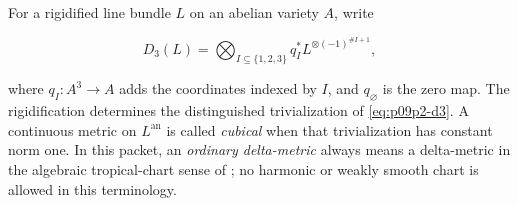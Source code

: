 
For a rigidified line bundle \(L\) on an abelian variety \(A\), write

\begin{equation}
\label{eq:p09p2-d3}
 D_3(L)=
 \bigotimes_{I\subseteq\{1,2,3\}}
 q_I^*L^{\otimes(-1)^{\# I+1}},
\end{equation}

where \(q_I:A^3\to A\) adds the coordinates indexed by \(I\), and \(q_\varnothing\)
is the zero map.  The rigidification determines the distinguished
trivialization of \eqref{eq:p09p2-d3}.  A continuous metric on \(L^{\mathrm{an}}\)
is called \emph{cubical} when that trivialization has constant norm one.
In this packet, an \emph{ordinary delta-metric} always means a delta-metric
in the algebraic tropical-chart sense of
\cite[Definition~9.9 and \S9.13]{GK17}; no harmonic or weakly smooth chart is
allowed in this terminology.

